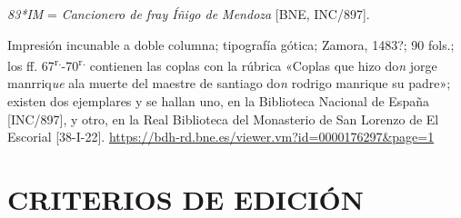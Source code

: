 \documentclass[11pt,a4paper,twoside]{article}
\newcommand{\comillas}[1]{«#1»}
\newcommand{\tsup}[1]{\textsuperscript{#1}}
\begin{document}
\textit{83*IM} = \textit{Cancionero de fray Íñigo de Mendoza} [BNE, INC/897].

Impresión incunable a doble columna; tipografía gótica; Zamora, 1483?; 90 fols.; los ff. 67\tsup{r.}-70\tsup{r.} contienen las coplas con la rúbrica \comillas{Coplas que hizo do\textit{n} jorge manrriq\textit{ue} ala muerte del maestre de santiago do\textit{n} rodrigo manrique su padre}; existen dos ejemplares y se hallan uno, en la Biblioteca Nacional de España [INC/897], y otro, en la Real Biblioteca del Monasterio de San Lorenzo de El Escorial [38-I-22]. \url{https://bdh-rd.bne.es/viewer.vm?id=0000176297&page=1}

\section*{\fontsize{13}{14.35}\selectfont CRITERIOS DE EDICIÓN}
\end{document}
